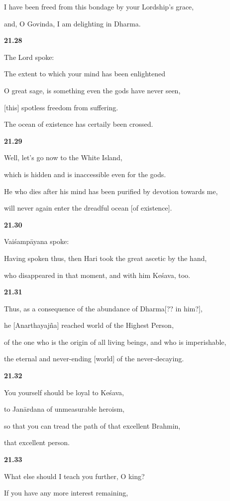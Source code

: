 \documentclass[12pt]{article} %
\begin{document}
      I have been freed from this bondage by your Lordship's grace, 

      and, O Govinda, I am delighting in Dharma. 

\textbf{21.28}

 The Lord spoke: 

      The extent to which your mind has been enlightened 

      O great sage, is something even the gods have never seen, 

      [this] spotless freedom from suffering. 

      The ocean of existence has certaily been crossed. 

\textbf{21.29}

 Well, let's go now to the White Island, 

      which is hidden and is inaccessible even for the gods. 

      He who dies after his mind has been purified by devotion towards me, 

      will never again enter the dreadful ocean [of existence]. 

\textbf{21.30}

 Vaiśampāyana spoke: 

      Having spoken thus, then Hari took the great ascetic by the hand, 

      who disappeared in that moment, and with him Keśava, too. 

\textbf{21.31}

 Thus, as a consequence of the abundance of Dharma[?? in him?], 

      he [Anarthayajña] reached world of the Highest Person, 

      of the one who is the origin of all living beings, and who is imperishable, 

      the eternal and never-ending [world] of the never-decaying. 

\textbf{21.32}

 You yourself should be loyal to Keśava, 

      to Janārdana of unmeasurable heroism, 

      so that you can tread the path of that excellent Brahmin, 

      that excellent person. 

\textbf{21.33}

 What else should I teach you further, O king?

      If you have any more interest remaining,
\end{document}
